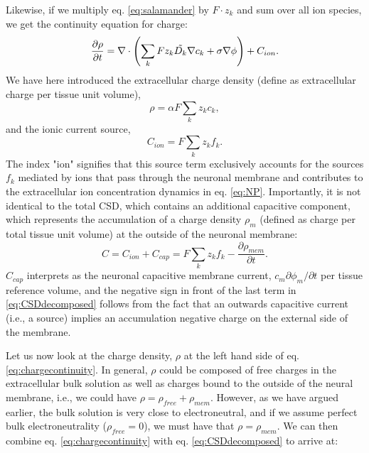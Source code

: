 Likewise, if we multiply eq. \ref{eq:salamander} by $F\cdot z_k$ and sum over all ion species, we get the continuity equation for charge: 
\begin{equation}
\frac{\partial \rho}{\partial t} =  \nabla \cdot \left (\sum_k{F z_k \tilde{D_k}{\bf \nabla} c_{k}} + \sigma\nabla\phi  \right)  + C_{ion}.
\label{eq:chargecontinuity}
\end{equation}
We have here introduced the extracellular charge density (define as extracellular charge per tissue unit volume), 
\begin{equation}
\rho = \alpha F \sum_k z_k c_k,  
\label{eq:roen}
\end{equation}
and the ionic current source, 
\begin{equation}
C_{ion} = F \sum_k z_k f_k. 
\label{eq:csden}
\end{equation}
The index "ion" signifies that this source term exclusively accounts for the sources $f_k$ mediated by ions that pass through the neuronal membrane and contributes to the extracellular ion concentration dynamics in eq. \ref{eq:NP}. Importantly, it is not identical to the total CSD, which contains an additional capacitive component, which represents the accumulation of a charge density $\rho_m$ (defined as charge per total tissue unit volume) at the outside of the neuronal membrane:
\begin{equation}
C = C_{ion} + C_{cap} = F \sum_k z_k f_k - \frac{\partial \rho_{mem}}{\partial t}.
\label{eq:CSDdecomposed}
\end{equation}
$C_{cap}$ interprets as the neuronal capacitive membrane current, $c_m \partial \phi_m/\partial t$ per tissue reference volume, and the negative sign in front of the last term in \ref{eq:CSDdecomposed} follows from the fact that an outwards capacitive current (i.e., a source) implies an accumulation negative charge on the external side of the membrane. 

Let us now look at the charge density, $\rho$ at the left hand side of eq. \ref{eq:chargecontinuity}. In general, $\rho$ could be composed of free charges in the extracellular bulk solution as well as charges bound to the outside of the neural membrane, i.e., we could have $\rho = \rho_{free} + \rho_{mem}$. However, as we have argued earlier, the bulk solution is very close to electroneutral, and if we assume perfect bulk electroneutrality ($\rho_{free} = 0$), we must have that $\rho=\rho_{mem}$. We can then combine eq. \ref{eq:chargecontinuity}  with eq. \ref{eq:CSDdecomposed} to arrive at:

